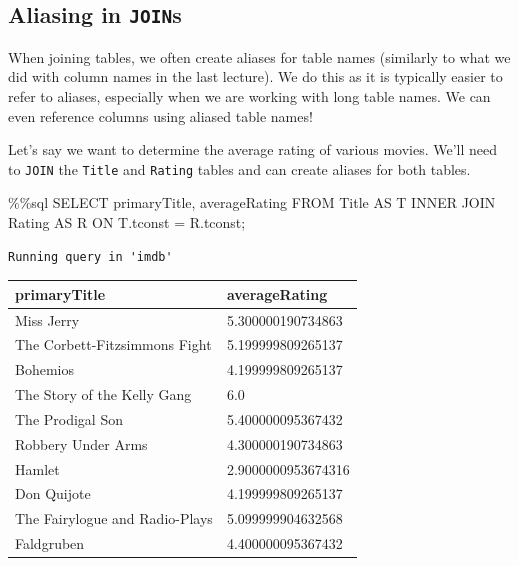 \documentclass[
  letterpaper,
  DIV=11,
  numbers=noendperiod]{scrreprt}
\newenvironment{Shaded}{\begin{snugshade}}{\end{snugshade}}
\newcommand{\NormalTok}[1]{\textcolor[rgb]{0.00,0.23,0.31}{#1}}
\newcommand{\OperatorTok}[1]{\textcolor[rgb]{0.37,0.37,0.37}{#1}}
\begin{document}
\subsection{\texorpdfstring{Aliasing in
\texttt{JOIN}s}{Aliasing in JOINs}}\label{aliasing-in-joins}

When joining tables, we often create aliases for table names (similarly
to what we did with column names in the last lecture). We do this as it
is typically easier to refer to aliases, especially when we are working
with long table names. We can even reference columns using aliased table
names!

Let's say we want to determine the average rating of various movies.
We'll need to \texttt{JOIN} the \texttt{Title} and \texttt{Rating}
tables and can create aliases for both tables.

\begin{Shaded}
\begin{Highlighting}[]
\OperatorTok{\%\%}\NormalTok{sql}
\NormalTok{SELECT primaryTitle, averageRating}
\NormalTok{FROM Title AS T INNER JOIN Rating AS R}
\NormalTok{ON T.tconst }\OperatorTok{=}\NormalTok{ R.tconst}\OperatorTok{;}
\end{Highlighting}
\end{Shaded}

\begin{verbatim}
Running query in 'imdb'
\end{verbatim}

\begin{longtable}[]{@{}ll@{}}
\toprule\noalign{}
primaryTitle & averageRating \\
\midrule\noalign{}
\endhead
\bottomrule\noalign{}
\endlastfoot
Miss Jerry & 5.300000190734863 \\
The Corbett-Fitzsimmons Fight & 5.199999809265137 \\
Bohemios & 4.199999809265137 \\
The Story of the Kelly Gang & 6.0 \\
The Prodigal Son & 5.400000095367432 \\
Robbery Under Arms & 4.300000190734863 \\
Hamlet & 2.9000000953674316 \\
Don Quijote & 4.199999809265137 \\
The Fairylogue and Radio-Plays & 5.099999904632568 \\
Faldgruben & 4.400000095367432 \\
\end{longtable}
\end{document}
